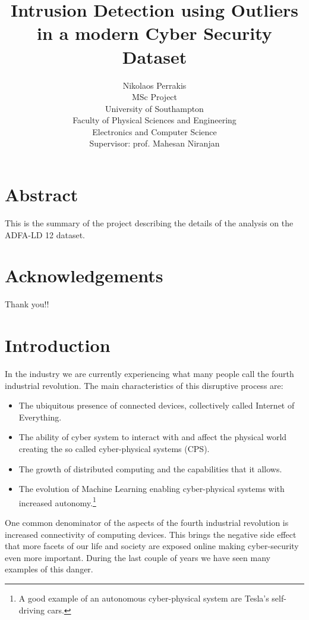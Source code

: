\documentclass[reqno,openany,12pt]{amsbook}
\title{Intrusion Detection using Outliers in a modern Cyber Security Dataset}
\author{Nikolaos Perrakis\\
{\small
MSc Project\\[-1 ex]
University of Southampton\\[-1 ex]
Faculty of Physical Sciences and Engineering\\[-1 ex]
Electronics and Computer Science\\[-1 ex]
}
Supervisor: prof. Mahesan Niranjan
}
\begin{document}
\maketitle

\frontmatter


\chapter*{Abstract}
\setcounter{page}{1}
This is the summary of the project describing the details of the analysis on the ADFA-LD 12 dataset.



\chapter*{Acknowledgements}

Thank you!!


\tableofcontents
\listoffigures
\listoftables


\mainmatter

\chapter{Introduction}

In the industry we are currently experiencing what many people call the fourth industrial revolution. The main characteristics of this disruptive process are:
\begin{itemize}
\item The ubiquitous presence of connected devices, collectively called Internet of Everything.
\item The ability of cyber system to interact with and affect the physical world creating the so called cyber-physical systems (CPS).
\item The growth of distributed computing and the capabilities that it allows.
\item The evolution of Machine Learning enabling cyber-physical systems with increased autonomy.\footnote{A good example of an autonomous cyber-physical system are Tesla's self-driving cars.}
\end{itemize}
One common denominator of the aspects of the fourth industrial revolution is increased connectivity of computing devices. This brings the negative side effect that more facets of our life and society are exposed online making cyber-security even more important. During the last couple of years we have seen many examples of this danger.
\end{document}
